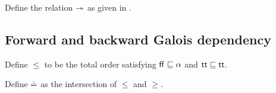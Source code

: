 




\begin{definition}
   \label{def:core-language:closeDefs}
   Define the relation $\twoheadrightarrow$ as given in .
\end{definition}

\subsection{Forward and backward Galois dependency}
\label{ssec:core-fwd-bwd}



\begin{definition}
   Define $\leq$ to be the total order satisfying $\mathsf{ff} \sqsubseteq \alpha$ and $\mathsf{tt} \sqsubseteq \mathsf{tt}$.
\end{definition}

\begin{definition}
   Define $\doteq$ as the intersection of $\leq$ and $\geq$.
\end{definition}




